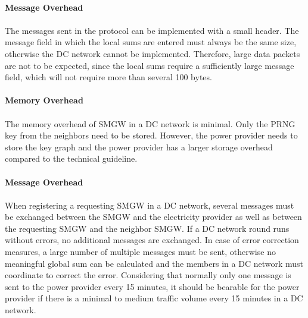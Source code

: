 \\
\textbf{Message Overhead}
\\
\\
The messages sent in the protocol can be implemented with a small header. The message field in which the local sums are entered must always be the same size, otherwise the DC network cannot be implemented. Therefore, large data packets are not to be expected, since the local sums require a sufficiently large message field, which will not require more than several 100 bytes. \\
\\
\textbf{Memory Overhead}
\\
\\
The memory overhead of SMGW in a DC network is minimal. Only the PRNG key from the neighbors need to be stored. However, the power provider needs to store the key graph and the power provider has a larger storage overhead compared to the technical guideline. 
\\
\\
\textbf{Message Overhead}
\\
\\
When registering a requesting SMGW in a DC network, several messages must be exchanged between the SMGW and the electricity provider as well as between the requesting SMGW and the neighbor SMGW. If a DC network round runs without errors, no additional messages are exchanged.
In case of error correction measures, a large number of multiple messages must be sent, otherwise no meaningful global sum can be calculated and the members in a DC network must coordinate to correct the error. Considering that normally only one message is sent to the power provider every 15 minutes, it should be bearable for the power provider if there is a minimal to medium traffic volume every 15 minutes in a DC network.
